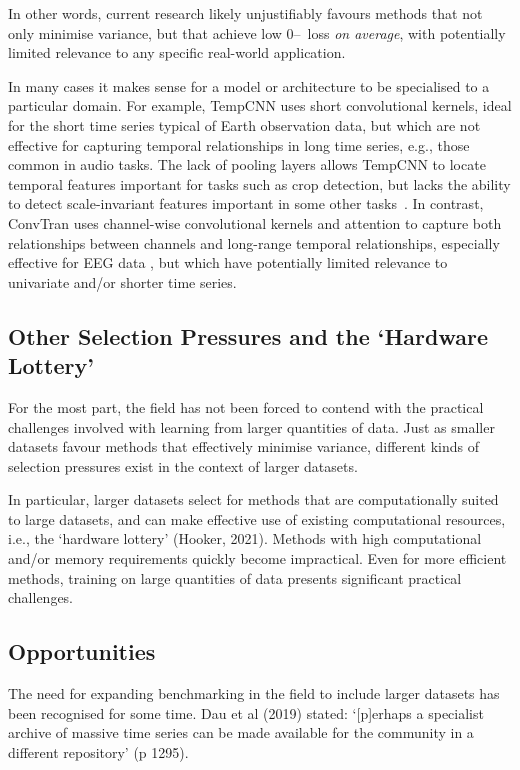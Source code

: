 \documentclass[twoside,11pt,preprint]{article}
\newcommand{\zo}{\mbox{0--\!1}~loss}
\begin{document}
In other words, current research likely unjustifiably favours methods that not only minimise variance, but that achieve low {\zo} \textit{on average}, with potentially limited relevance to any specific real-world application.

In many cases it makes sense for a model or architecture to be specialised to a particular domain. For example, TempCNN uses short convolutional kernels, ideal for the short time series typical of Earth observation data, but which are not effective for capturing temporal relationships in long time series, e.g., those common in audio tasks. The lack of pooling layers allows TempCNN to locate temporal features important for tasks such as crop detection, but lacks the ability to detect scale-invariant features important in some other tasks~\citep{Pelletier2019}. In contrast, ConvTran uses channel-wise convolutional kernels and attention to capture both relationships between channels and long-range temporal relationships, especially effective for EEG data \citep{ConvTran}, but which have potentially limited relevance to univariate and/or shorter time series.

\subsection{Other Selection Pressures and the `Hardware Lottery'}

For the most part, the field has not been forced to contend with the practical challenges involved with learning from larger quantities of data. Just as smaller datasets favour methods that effectively minimise variance, different kinds of selection pressures exist in the context of larger datasets.

In particular, larger datasets select for methods that are computationally suited to large datasets, and can make effective use of existing computational resources, i.e., the `hardware lottery' (Hooker, 2021). Methods with high computational and/or memory requirements quickly become impractical. Even for more efficient methods, training on large quantities of data presents significant practical challenges.

\subsection{Opportunities}

The need for expanding benchmarking in the field to include larger datasets has been recognised for some time. Dau et al (2019) stated: `[p]erhaps a specialist archive of massive time series can be made available for the community in a different repository' (p 1295).
\end{document}
